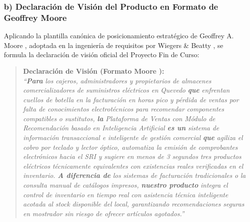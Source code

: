 \subsubsection{b) Declaración de Visión del Producto en Formato de Geoffrey Moore}
Aplicando la plantilla canónica de posicionamiento estratégico de Geoffrey A. Moore \cite{moore2014}, adoptada en la ingeniería de requisitos por Wiegers \& Beatty \cite{wiegers2013}, se formula la declaración de visión oficial del Proyecto Fin de Curso:
\begin{quote}
	\textbf{Declaración de Visión (Formato Moore \cite{moore2014}):} \\
	\textit{``\textbf{Para} los cajeros, administradores y propietarios de almacenes comercializadores de suministros eléctricos en Quevedo \textbf{que} enfrentan cuellos de botella en la facturación en horas pico y pérdida de ventas por falta de conocimientos electrotécnicos para recomendar componentes compatibles o sustitutos, \textbf{la} Plataforma de Ventas con Módulo de Recomendación basado en Inteligencia Artificial \textbf{es un} sistema de información transaccional e inteligente de gestión comercial \textbf{que} agiliza el cobro por teclado y lector óptico, automatiza la emisión de comprobantes electrónicos hacia el SRI y sugiere en menos de 3 segundos tres productos eléctricos técnicamente equivalentes con existencias reales verificadas en el inventario. \textbf{A diferencia de} los sistemas de facturación tradicionales o la consulta manual de catálogos impresos, \textbf{nuestro producto} integra el control de inventario en tiempo real con asistencia técnica inteligente acotada al stock disponible del local, garantizando recomendaciones seguras en mostrador sin riesgo de ofrecer artículos agotados.''}
\end{quote}
